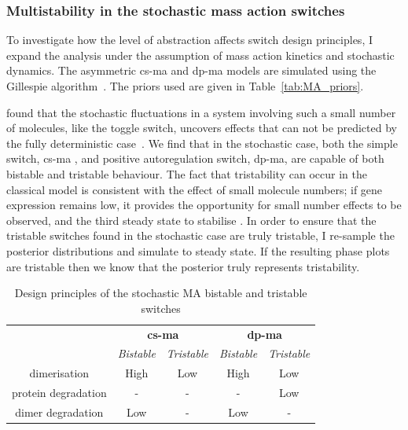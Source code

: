 \subsubsection{Multistability in the stochastic mass action switches}

To investigate how the level of abstraction affects switch design principles, I expand the analysis under the assumption of mass action kinetics and stochastic dynamics. The asymmetric \acrshort{cs-ma} and \acrshort{dp-ma} models are simulated using the Gillespie algorithm~\autocite{Gillespie:1977ww}. The priors used are given in Table~\ref{tab:MA_priors}.

\textcite{Ma:2012dt} found that the stochastic fluctuations in a system involving such a small number of molecules, like the toggle switch, uncovers effects that can not be predicted by the fully deterministic case~\autocite{Ma:2012dt}. We find that in the stochastic case, both the simple switch, \acrshort{cs-ma} , and positive autoregulation switch, \acrshort{dp-ma}, are capable of both bistable and tristable behaviour. The fact that tristability can occur in the classical model is consistent with the effect of small molecule numbers; if gene expression remains low, it provides the opportunity for small number effects to be observed, and the third steady state to stabilise \autocite{Ma:2012dt}. In order to ensure that the tristable switches found in the stochastic case are truly tristable, I re-sample the posterior distributions and simulate to steady state. If the resulting phase plots are tristable then we know that the posterior truly represents tristability. 


\begin{table}[tb]
\centering
\caption{Design principles of the stochastic MA bistable and tristable switches}
\label{tab:des_prin}
\begin{tabular}{@{}ccccc@{}}
\toprule
                    & \multicolumn{2}{c}{\textbf{\acrshort{cs-ma}}} & \multicolumn{2}{c}{\textbf{\acrshort{dp-ma}}} \\ \cmidrule(l){2-3}\cmidrule(l){4-5}
                    & \textit{Bistable}    & \textit{Tristable}   & \textit{Bistable}    & \textit{Tristable}   \\\cmidrule(l){2-2}\cmidrule(l){3-3}\cmidrule(l){4-4}\cmidrule(l){5-5}
dimerisation        & High        & Low         & High        & Low         \\
protein degradation & -           & -           & -           & Low         \\
dimer degradation   & Low         & -           & Low         & -           \\\bottomrule
\end{tabular}
\end{table}

